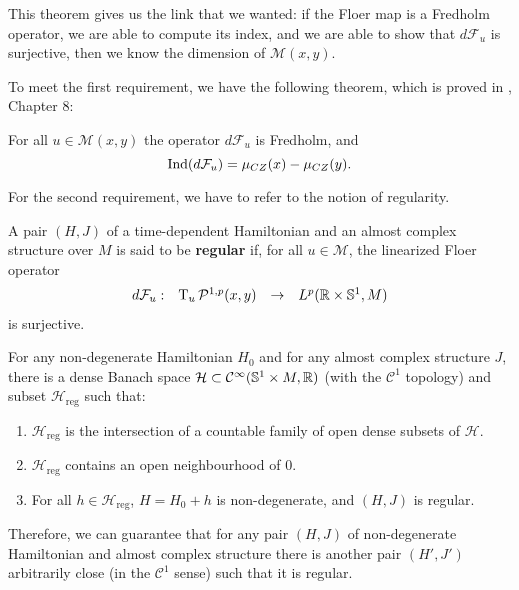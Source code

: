 This theorem gives us the link that we wanted: if the Floer map is a Fredholm operator, we are able to compute its index, and we are able to show that $d\mathcal{F}_u$ is surjective, then we know the dimension of $\mathcal{M}(x,y)$.

To meet the first requirement, we have the following theorem, which is proved in \cite{audin2014morse}, Chapter 8:

\begin{theo} \label{theo:floer_fredholm}
For all $u \in \mathcal{M}(x,y)$ the operator $d\mathcal{F}_u$ is Fredholm, and
\[\mathrm{Ind}(d\mathcal{F}_u) = \mu_{CZ}(x) - \mu_{CZ}(y) .\]
\end{theo}

For the second requirement, we have to refer to the notion of regularity.

\begin{deff}
A pair $(H,J)$ of a time-dependent Hamiltonian and an almost complex structure over $M$ is said to be {\bf regular} if, for all $u \in \mathcal{M}$, the linearized Floer operator
\[\begin{array}{rccc} d\mathcal{F}_u : & \operatorname T_u \mathcal{P}^{1,p}(x,y) & \rightarrow & L^p(\mathbb{R}\times\mathbb{S}^1,M) \end{array}\]
is surjective.
\end{deff}

\begin{theo} \label{theo:regular}
For any non-degenerate Hamiltonian $H_0$ and for any almost complex structure $J$, there is a dense Banach space $\mathcal{H} \subset \mathcal{C}^{\infty}(\mathbb{S}^1 \times M, \mathbb{R})$ (with the $\mathcal{C}^1$ topology) and subset $\mathcal{H}_{\mathrm{reg}}$ such that:
\begin{enumerate}
	\item $\mathcal{H}_{\mathrm{reg}}$ is the intersection of a countable family of open dense subsets of $\mathcal{H}$.
	\item $\mathcal{H}_{\mathrm{reg}}$ contains an open neighbourhood of $0$.
	\item For all $h \in \mathcal{H}_{\mathrm{reg}}$, $H = H_0 + h$ is non-degenerate, and $(H,J)$ is regular.
\end{enumerate}
\end{theo}

Therefore, we can guarantee that for any pair $(H,J)$ of non-degenerate Hamiltonian and almost complex structure there is another pair $(H',J')$ arbitrarily close (in the $\mathcal{C}^1$ sense) such that it is regular.

